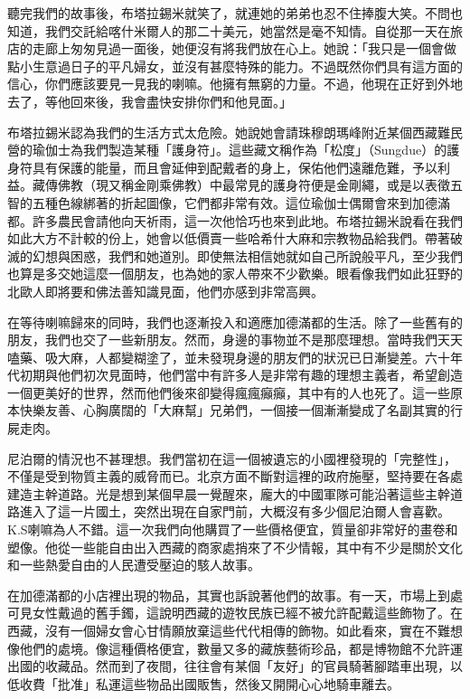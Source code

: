 聽完我們的故事後，布塔拉錫米就笑了，就連她的弟弟也忍不住捧腹大笑。不問也知道，我們交託給喀什米爾人的那二十美元，她當然是毫不知情。自從那一天在旅店的走廊上匆匆見過一面後，她便沒有將我們放在心上。她說：「我只是一個會做點小生意過日子的平凡婦女，並沒有甚麼特殊的能力。不過既然你們具有這方面的信心，你們應該要見一見我的喇嘛。他擁有無窮的力量。不過，他現在正好到外地去了，等他回來後，我會盡快安排你們和他見面。」

布塔拉錫米認為我們的生活方式太危險。她說她會請珠穆朗瑪峰附近某個西藏難民營的瑜伽士為我們製造某種「護身符」。這些藏文稱作為「松度」（Sungdue）的護身符具有保護的能量，而且會延伸到配戴者的身上，保佑他們遠離危難，予以利益。藏傳佛教（現又稱金剛乘佛教）中最常見的護身符便是金剛繩，或是以表徵五智的五種色線綁著的折起圖像，它們都非常有效。這位瑜伽士偶爾會來到加德滿都。許多農民會請他向天祈雨，這一次他恰巧也來到此地。布塔拉錫米說看在我們如此大方不計較的份上，她會以低價賣一些哈希什大麻和宗教物品給我們。帶著破滅的幻想與困惑，我們和她道別。即使無法相信她就如自己所說般平凡，至少我們也算是多交她這麼一個朋友，也為她的家人帶來不少歡樂。眼看像我們如此狂野的北歐人即將要和佛法善知識見面，他們亦感到非常高興。

在等待喇嘛歸來的同時，我們也逐漸投入和適應加德滿都的生活。除了一些舊有的朋友，我們也交了一些新朋友。然而，身邊的事物並不是那麼理想。當時我們天天嗑藥、吸大麻，人都變糊塗了，並未發現身邊的朋友們的狀況已日漸變差。六十年代初期與他們初次見面時，他們當中有許多人是非常有趣的理想主義者，希望創造一個更美好的世界，然而他們後來卻變得瘋瘋癲癲，其中有的人也死了。這一些原本快樂友善、心胸廣闊的「大麻幫」兄弟們，一個接一個漸漸變成了名副其實的行屍走肉。

尼泊爾的情況也不甚理想。我們當初在這一個被遺忘的小國裡發現的「完整性」，不僅是受到物質主義的威脅而已。北京方面不斷對這裡的政府施壓，堅持要在各處建造主幹道路。光是想到某個早晨一覺醒來，龐大的中國軍隊可能沿著這些主幹道路進入了這一片國土，突然出現在自家門前，大概沒有多少個尼泊爾人會喜歡。K.S喇嘛為人不錯。這一次我們向他購買了一些價格便宜，質量卻非常好的畫卷和塑像。他從一些能自由出入西藏的商家處捎來了不少情報，其中有不少是關於文化和一些熱愛自由的人民遭受壓迫的駭人故事。

在加德滿都的小店裡出現的物品，其實也訴說著他們的故事。有一天，市場上到處可見女性戴過的舊手鐲，這說明西藏的遊牧民族已經不被允許配戴這些飾物了。在西藏，沒有一個婦女會心甘情願放棄這些代代相傳的飾物。如此看來，實在不難想像他們的處境。像這種價格便宜，數量又多的藏族藝術珍品，都是博物館不允許運出國的收藏品。然而到了夜間，往往會有某個「友好」的官員騎著腳踏車出現，以低收費「批准」私運這些物品出國販售，然後又開開心心地騎車離去。

